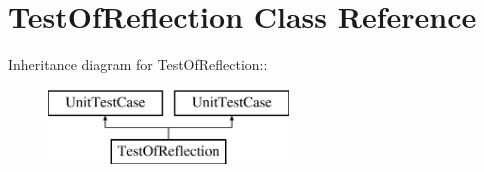 \hypertarget{class_test_of_reflection}{
\section{TestOfReflection Class Reference}
\label{class_test_of_reflection}
}
Inheritance diagram for TestOfReflection::\begin{figure}[H]
\begin{center}
\leavevmode
\includegraphics[height=2cm]{class_test_of_reflection}
\end{center}
\end{figure}
